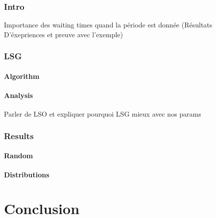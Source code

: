 \documentclass[a4paper,10pt]{article}
\begin{document}
     \subsubsection{Intro}
	Importance des waiting times quand la période est donnée (Résultats D'éxepriences et preuve avec l'exemple)
     \subsubsection{LSG}
	\paragraph{Algorithm}
	\paragraph{Analysis}
	  Parler de LSO et expliquer pourquoi LSG mieux avec nos params
     \subsubsection{Results}
	 \paragraph{Random}
	 \paragraph{Distributions}
   
\section{Conclusion}
\end{document}
